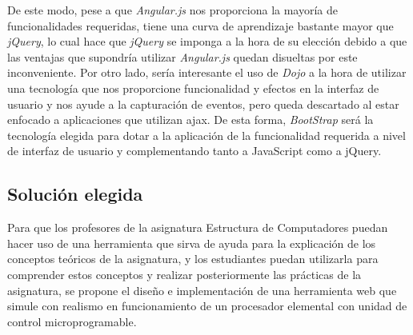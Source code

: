 \begin{table}[htbp]
\centering
\caption{Comparación de frameworks y bibliotecas.}
\label{tab:comparison_webframeworks}
\end{table}

De este modo,  pese a que \textit{Angular.js} nos proporciona la mayoría de funcionalidades requeridas, tiene una curva de aprendizaje bastante mayor que \textit{jQuery}, lo cual hace que \textit{jQuery} se imponga a la hora de su elección debido a que las ventajas que supondría utilizar \textit{Angular.js} quedan disueltas por este inconveniente. Por otro lado, sería interesante el uso de \textit{Dojo} a la hora de utilizar una tecnología que nos proporcione funcionalidad y efectos en la interfaz de usuario y nos ayude a la capturación de eventos, pero queda descartado al estar enfocado a aplicaciones que utilizan \acrshort{ajax}. De esta forma, \textit{BootStrap} será la tecnología elegida para dotar a la aplicación de la funcionalidad requerida a nivel de interfaz de usuario y complementando tanto a JavaScript como a jQuery.

\subsection{Solución elegida}
\label{sec:solution_selection}

Para que los profesores de la asignatura Estructura de Computadores puedan hacer uso de una herramienta que sirva de ayuda para la explicación de los conceptos teóricos de la asignatura, y los estudiantes puedan utilizarla para comprender estos conceptos y realizar posteriormente las prácticas de la asignatura, se propone el diseño e implementación de una herramienta web que simule con realismo en funcionamiento de un procesador elemental con unidad de control microprogramable.

